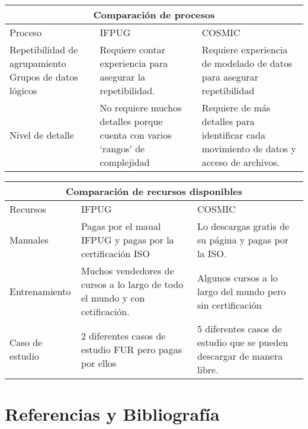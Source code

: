 \documentclass{mylib/reporteCorto}
\begin{document}
\begin{center}
    \begin{tabular}{ | p{4cm} | p{4.5cm} |p{4.5cm} |}
    \hline
    \multicolumn{3}{|c|}{Comparación de procesos} \\
  	\hline

	Proceso & IFPUG & COSMIC \\ \hline
	
	Repetibilidad de agrupamiento Grupos de datos lógicos &
	Requiere contar experiencia para asegurar la repetibilidad. &
	Requiere experiencia de modelado de datos para asegurar repetibilidad\\ \hline

	Nivel de detalle & 
	No requiere muchos detalles porque cuenta con varios `rangos' de complejidad &
	Requiere de más detalles para identificar cada movimiento de datos y acceso de archivos. \\ \hline

    \end{tabular}
\end{center}

\begin{center}
    \begin{tabular}{ | p{4cm} | p{4.5cm} |p{4.5cm} |}
    \hline
    \multicolumn{3}{|c|}{Comparación de recursos disponibles} \\
  	\hline

	Recursos & IFPUG & COSMIC \\ \hline
	
	Manuales &
	Pagas por el maual IFPUG y pagas por la certificación ISO &
	Lo descargas gratis de su página y pagas por la ISO.\\ \hline

	Entrenamiento & 
	Muchos vendedores de cursos a lo largo de todo el mundo y con cetificación. &
	Algunos cursos a lo largo del mundo pero sin certificación \\ \hline

	Caso de estudio & 
	2 diferentes casos de estudio FUR pero pagas por ellos &
	5 diferentes casos de estudio que se pueden descargar de manera libre. \\ \hline

    \end{tabular}
\end{center}



\section{Referencias y Bibliografía}
\end{document}
